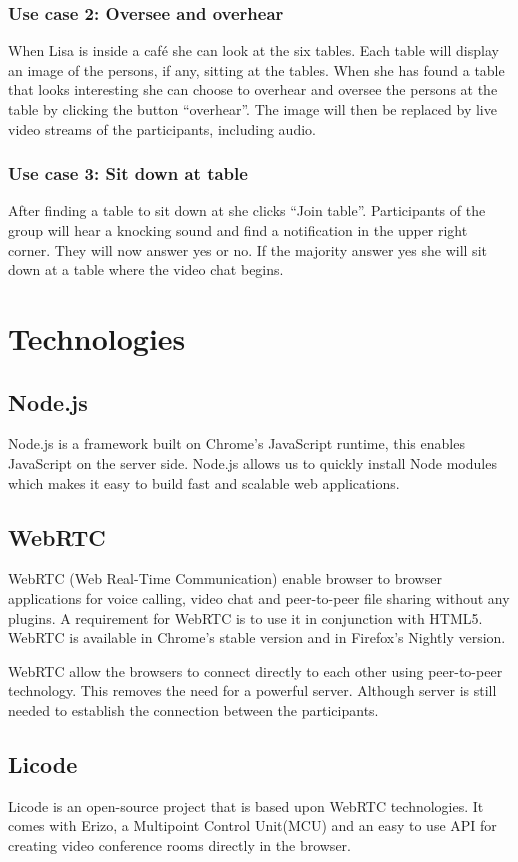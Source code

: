 \documentclass[12pt, titlepage]{article}
\begin{document}
\subsubsection{Use case 2: Oversee and overhear}
When Lisa is inside a café she can look at the six tables. Each table will display an image of the persons, if any, sitting at the tables. When she has found a table that looks interesting she can choose to overhear and oversee the persons at the table by clicking the button “overhear”. The image will then be replaced by live video streams of the participants, including audio.
\subsubsection{Use case 3: Sit down at table}
After finding a table to sit down at she clicks “Join table”. Participants of the group will hear a knocking sound and find a notification in the upper right corner. They will now answer yes or no. If the majority answer yes she will sit down at a table where the video chat begins.
\section{Technologies}
\subsection{Node.js}
Node.js\cite{28} is a framework built on Chrome's JavaScript runtime, this enables JavaScript on the server side. Node.js allows us to quickly install Node modules which makes it easy to build fast and scalable web applications. 
\subsection{WebRTC}
WebRTC\cite{8} (Web Real-Time Communication) enable browser to browser applications for voice calling, video chat and peer-to-peer file sharing without any plugins. A requirement for WebRTC is to use it in conjunction with HTML5. WebRTC is available in Chrome's stable version and in Firefox's Nightly version.

WebRTC allow the browsers to connect directly to each other using peer-to-peer technology. This removes the need for a powerful server. Although server is still needed to establish the connection between the participants.
\subsection{Licode}
Licode\cite{29} is an open-source project that is based upon WebRTC technologies. It comes with Erizo, a Multipoint Control Unit(MCU) and an easy to use API for creating video conference rooms directly in the browser. 
\end{document}
